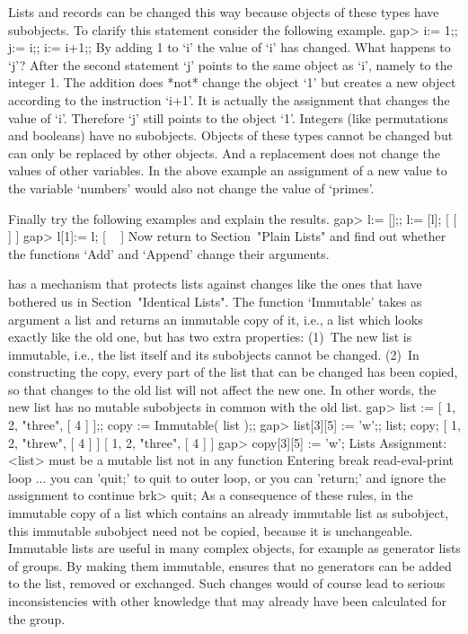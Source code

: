 Lists and records can be changed this way because {\GAP} objects of these
types have subobjects.
To clarify this statement consider the following example.
\beginexample
gap> i:= 1;; j:= i;; i:= i+1;; 
\endexample
By adding 1 to `i' the value of `i' has  changed.   What  happens to `j'?
After the second statement `j' points to the same object  as `i',  namely
to the  integer 1.  The  addition  does *not* change  the object `1'  but
creates a new object according  to the instruction `i+1'.  It is actually
the assignment that changes the value of `i'.  Therefore `j' still points
to  the object `1'.  Integers  (like permutations and  booleans)  have no
subobjects.  Objects  of these types  cannot  be  changed but can only be
replaced by other objects.   And a replacement does not change the values
of other variables.  In the above example an assignment of a new value to
the variable `numbers' would also not change the value of `primes'.

Finally try the following examples and explain the results.
\beginexample
gap> l:= [];; l:= [l];
[ [  ] ]
gap> l[1]:= l;
[ ~ ]
\endexample
Now return to Section~"Plain Lists" and find out whether the functions
`Add' and `Append' change their arguments.


{\GAP} has a mechanism that protects lists against  changes like the ones
that have bothered   us in    Section~"Identical Lists". The     function
`Immutable' takes as argument a list and returns an immutable copy of it,
i.e., a list  which  looks exactly like the   old one, but has  two extra
properties:
(1)~The new list is immutable, i.e.,  the list itself and its subobjects 
    cannot be changed.
(2)~In constructing the copy, every part of  the list that can be changed
    has been copied, so that changes to the  old list will not affect the
    new one.  In other words, the new  list has no  mutable subobjects in
    common with the old list.
\begintt
gap> list := [ 1, 2, "three", [ 4 ] ];; copy := Immutable( list );;
gap> list[3][5] := 'w';; list; copy;
[ 1, 2, "threw", [ 4 ] ]
[ 1, 2, "three", [ 4 ] ]
gap> copy[3][5] := 'w';
Lists Assignment: <list> must be a mutable list
not in any function
Entering break read-eval-print loop ...
you can 'quit;' to quit to outer loop, or
you can 'return;' and ignore the assignment to continue
brk> quit;
\endtt
As a consequence of  these rules, in the  immutable copy of a list  which
contains an already immutable list as subobject, this immutable subobject
need not be copied,  because it is unchangeable. Immutable lists are
useful in many complex {\GAP} objects,  for example as generator lists of
groups. By  making them immutable, {\GAP}  ensures that no generators can
be added to the list, removed or exchanged. Such  changes would of course
lead  to serious inconsistencies with  other  knowledge that may already
have been calculated for the group.

